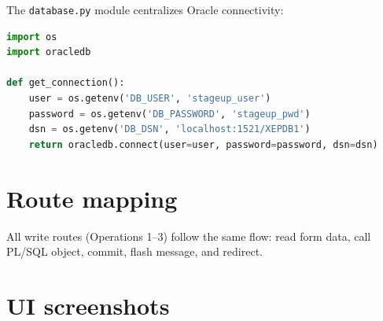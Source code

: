 The \texttt{database.py} module centralizes Oracle connectivity:

\begin{lstlisting}[language=Python]
import os
import oracledb

def get_connection():
    user = os.getenv('DB_USER', 'stageup_user')
    password = os.getenv('DB_PASSWORD', 'stageup_pwd')
    dsn = os.getenv('DB_DSN', 'localhost:1521/XEPDB1')
    return oracledb.connect(user=user, password=password, dsn=dsn)
\end{lstlisting}

\section{Route mapping}

\begin{table}[H]
    \centering
    \caption{Route mapping summary}
\end{table}

\noindent All write routes (Operations 1--3) follow the same flow: read form data, call PL/SQL object, commit, flash message, and redirect.

\section{UI screenshots}

